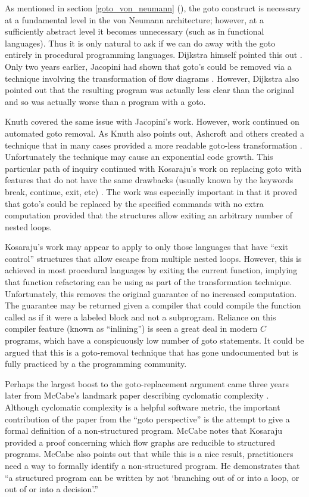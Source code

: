\documentclass[letterpaper,12pt]{article}
\newcommand{\fullref}[1]{section \ref{#1} (\emph{\nameref{#1}})}
\begin{document}
As mentioned in \fullref{goto_von_neumann}, the goto construct is necessary at a
fundamental level in the von Neumann architecture; however, at a sufficiently
abstract level it becomes unnecessary (such as in functional languages).
Thus it is only natural to ask if we can do away with the goto entirely in
procedural programming languages.  Dijkstra himself pointed this
out \cite{dijkstra}.  Only two years earlier, Jacopini had shown that goto's
could be removed via a technique involving the transformation of flow
diagrams \cite{jacopini}.  However, Dijkstra also pointed out that the resulting
program was actually less clear than the original and so was actually worse
than a program with a goto.

Knuth covered the same issue with Jacopini's work.  However, work continued on
automated goto removal.  As Knuth also points out, Ashcroft and others created
a technique that in many cases provided a more readable goto-less transformation
\cite{ashcroft}. Unfortunately the technique may cause an exponential code growth.
This particular path of inquiry continued with Kosaraju's work on replacing
goto with features that do not have the same drawbacks (usually known by
the keywords break, continue, exit, etc) \cite{kosaraju}.
The work was especially important in that it proved that goto's
could be replaced by the specified commands with no extra computation provided
that the structures allow exiting an arbitrary number of nested loops.

Kosaraju's work may appear to apply to only those languages that have ``exit
control'' structures that allow escape from multiple nested loops.
However, this is achieved in most procedural languages by exiting the
current function, implying that function
refactoring can be using as part of the transformation technique.
Unfortunately, this removes the original guarantee of no increased computation.
The guarantee may be returned given a compiler that could compile the function called
as if it were a labeled block and not a subprogram.  Reliance on this compiler
feature (known as ``inlining'') is seen a great deal in modern $C$ programs,
which have a conspicuously low number of goto statements.  It could be argued
that this is a goto-removal technique that has gone undocumented but is fully
practiced by a the programming community.

Perhaps the largest boost to the goto-replacement argument came three years later
from McCabe's landmark paper describing cyclomatic complexity \cite{mccabe}.
Although cyclomatic complexity is a helpful software metric, the important
contribution of the paper from the ``goto perspective'' is the attempt to give
a formal definition of a non-structured program.  McCabe notes that Kosaraju
\cite{kosaraju} provided a proof concerning which flow graphs are reducible to
structured programs.  McCabe also points out that while this is a nice result,
practitioners need a way to formally identify a non-structured program.
He demonstrates that ``a structured program can be written by not `branching out of
or into a loop, or out of or into a decision'.'' \cite{mccabe}
\end{document}

